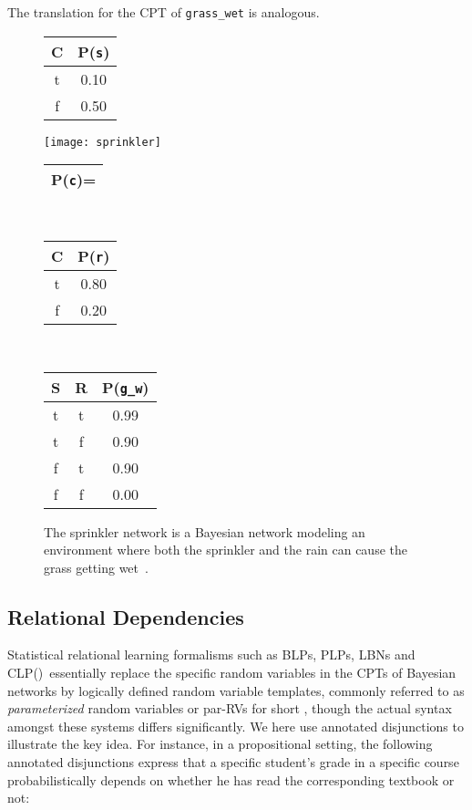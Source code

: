 \documentclass[a4paper]{article}
\newcommand{\clpbn}
  {CLP()}
\begin{document}
The translation for the CPT of \texttt{grass\_wet} is analogous. 
\begin{figure}[t]
  \centering
\begin{minipage}[c]{2cm}
    \begin{tabular}{|c|c|}\hline
        C & P(\texttt{s}) \\ \hline
        t & 0.10 \\
        f & 0.50\\ \hline
      \end{tabular}
\end{minipage}
\begin{minipage}[c]{5cm}
\texttt{[image: sprinkler]}
\end{minipage}
\begin{minipage}[c]{3cm}
\centering
  \begin{tabular}{|c|}
         \hline P(\texttt{c})=\\ \hline
       \end{tabular}\\
\vspace{0.2cm}
    \begin{tabular}{|c|c|}\hline
        C & P(\texttt{r}) \\ \hline
        t & 0.80 \\ f & 0.20\\ \hline
      \end{tabular}\\
 \vspace{0.2cm}
    \begin{tabular}{|cc|c|}\hline
        S & R & P(\texttt{g\_w}) \\ \hline
        t  & t &  0.99 \\
        t& f & 0.90 \\
        f & t & 0.90 \\
        f & f & 0.00 \\ \hline
      \end{tabular}
\end{minipage}
 \caption{The sprinkler network is a Bayesian network modeling an environment where both the sprinkler and the rain can cause the grass getting wet~\citep{russel:ai}.}
  \label{fig:sprinkler}
\end{figure}



\subsection{Relational Dependencies}
Statistical relational learning formalisms such as BLPs, PLPs, LBNs and \clpbn\
essentially replace the specific random variables in the CPTs of
Bayesian networks by logically defined random variable templates,
commonly referred to as \emph{parameterized} random variables or
par-RVs for short \citep{poole:ijcai03}, though the actual syntax
amongst these systems differs significantly. We here use annotated
disjunctions to illustrate the key idea. 
For instance, in a propositional setting, the following annotated
disjunctions express that a specific student's grade in a specific
course probabilistically depends on whether he has read the
corresponding textbook or not:
\end{document}
